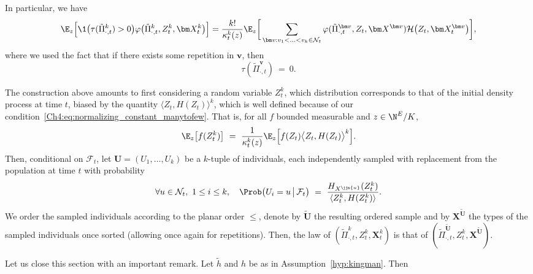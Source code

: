 \begin{refsegment}
In particular, we have
\begin{equation}\label{Ch4:eq:distinct_particles}
  \E_{z}\Big[ \1\big(\tau(\tilde{\Pi}^k_{\cdot,t})>0\big) \varphi\big(\tilde{\Pi}^k_{\cdot,t}, Z^k_t, \bm X^k_t\big)\Big] =
    \frac{k!}{\kappa^k_{t}(z)}  \E_{z}\bigg[ \sum_{\bm v:v_1 <  \ldots < v_k\in\mathcal{N}_t }\varphi(\tilde\Pi^{{\bm v}}_{\cdot,t} , Z_t, \bm X^{\bm v}) \mathcal{H}\big(Z_t,\bm X^{\bm v}_t\big)\bigg],
\end{equation}
where we used the fact that if there exists some repetition in ${\bm v}$, then
\[
\tau(\tilde{\Pi}_{\cdot,t}^{\bm v})\ =\ 0.
\]



\begin{rem}
The construction above amounts to first considering a random variable $Z^k_t$, which distribution corresponds to that of the initial density process at time $t$, biased by the quantity $\langle Z_t, H(Z_t)\rangle^k$, which is well defined because of our condition~\eqref{Ch4:eq:normalizing_constant_manytofew}. That is, for all $f$ bounded measurable and $z\in \N^E/K$,
\[
\E_z\big[f(Z^k_t)\big]\ =\ \frac{1}{\kappa^{k}_{t}(z)}\E_z\Big[f(Z_t)\big\langle Z_t, H(Z_t)\big\rangle^k\Big].
\]
Then, conditional on $\mathcal{F}_t$, let $\bm U=(U_1, \ldots, U_k)$ be a $k$-tuple of individuals, each independently sampled with replacement from the population at time $t$ with probability
\[
\forall u\in \mathcal{N}_t,\ 1\leq i\leq k,\quad \Prob \big( U_i=u \,\big|\, \mathcal{F}_t\big)\ =\ \frac{H_{X^{\jjn{u}}}(Z^k_t)}{\langle Z^k_t, H(Z^k_t)\rangle}.
\]
We order the sampled individuals according to the planar order $\leq$, denote by $\tilde{\bm U}$ the resulting ordered sample and by $\bm X^{\tilde{\bm U}}$ the types of the sampled individuals once sorted (allowing once again for repetitions).
Then, the law of $(\tilde \Pi^k_{\cdot,t}, Z^k_t, \bm X^k_t)$ is that of $(\tilde\Pi^{\tilde{\bm U}}_{\cdot,t}, Z^k_t, \bm X^{\tilde{\bm U}})$.
\end{rem}


\begin{rem}
Let us close this section with an important remark. 
Let $\tilde h$ and $h$ be as in Assumption~\ref{hyp:kingman}. Then  
\end{rem}



\end{refsegment}
